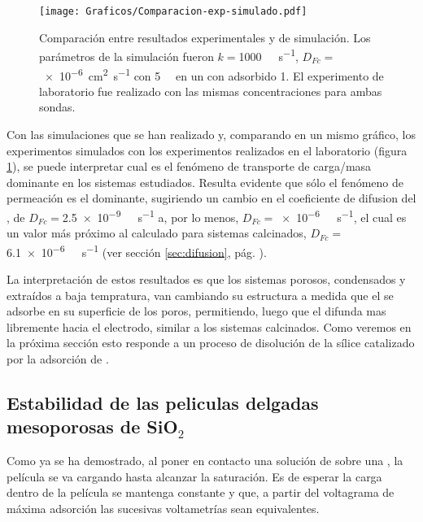 		
				\begin{figure}[ht]
					\centering
			 	    \texttt{[image: Graficos/Comparacion-exp-simulado.pdf]}
			        \caption[Simulación EQ comparadas con datos experimentales]{Comparación entre resultados experimentales y de simulación. Los parámetros de la simulación fueron $k=$\SI{1000}{\per\Molar\per\second}, $D_{Fc}=$ \SI{e-6}{\square\cm\per\second} con \fc\space \SI{5}{\milli\Molar} en un \pdm\space con \ru\space adsorbido \SI{1}{\Molar}. El experimento de laboratorio fue realizado con las mismas concentraciones para ambas sondas.}
			        \label{fig:comp_sim_exp}
			      	\end{figure}
		

		Con las simulaciones que se han realizado y, comparando en un mismo gráfico, los experimentos simulados con los experimentos realizados en el laboratorio (figura \ref{fig:comp_sim_exp}), se puede interpretar cual es el fenómeno de transporte de carga/masa dominante en los sistemas estudiados. Resulta evidente que sólo el fenómeno de permeación es el dominante, sugiriendo un cambio en el coeficiente de difusion del \fc, de $D_{Fc}=$\SI{2.5e-9}{\per\Molar\per\second} a, por lo menos, $D_{Fc}\!=$\SI{e-6}{\per\Molar\per\second}, el cual es un valor más próximo al calculado para sistemas calcinados, $D_{Fc}=$\SI{6.1e-6}{\per\Molar\per\second} (ver sección \ref{sec:difusion}, pág. \pageref{sec:difusion}). 

		La interpretación de estos resultados es que los sistemas porosos, condensados y extraídos a baja tempratura, van cambiando su estructura a medida que el \ru\space se adsorbe en su superficie de los poros, permitiendo, luego que el \fc\space difunda mas libremente hacia el electrodo, similar a los sistemas calcinados. Como veremos en la próxima sección esto responde a un proceso de disolución de la sílice catalizado por la adsorción de \aminorutenio.

	\subsection{Estabilidad de las peliculas delgadas mesoporosas de \texorpdfstring{SiO$_2$}{SiO2}}

		Como ya se ha demostrado, al poner en contacto una solución de \ru\space sobre una \pdmF, la película se va cargando hasta alcanzar la saturación. Es de esperar la carga dentro de la película se mantenga constante y que, a partir del voltagrama de máxima adsorción las sucesivas voltametrías sean equivalentes.

